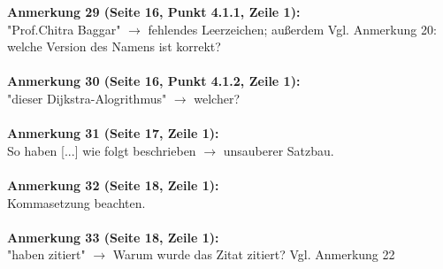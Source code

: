 \documentclass[a4paper,12pt]{book}
\begin{document}
\noindent
\textbf{Anmerkung 29 (Seite 16, Punkt 4.1.1, Zeile 1):}\\
"Prof.Chitra Baggar" $\rightarrow$ fehlendes Leerzeichen; außerdem Vgl. Anmerkung 20: welche Version des Namens ist korrekt?\\
\\

\noindent
\textbf{Anmerkung 30 (Seite 16, Punkt 4.1.2, Zeile 1):}\\
"dieser Dijkstra-Alogrithmus" $\rightarrow$ welcher? \\
\\

\noindent
\textbf{Anmerkung 31 (Seite 17, Zeile 1):}\\
So haben [...] wie folgt beschrieben $\rightarrow$ unsauberer Satzbau. \\
\\

\noindent
\textbf{Anmerkung 32 (Seite 18, Zeile 1):}\\
Kommasetzung beachten. \\
\\

\noindent
\textbf{Anmerkung 33 (Seite 18, Zeile 1):}\\
"haben zitiert" $\rightarrow$ Warum wurde das Zitat zitiert? Vgl. Anmerkung 22 \\
\\
\end{document}
